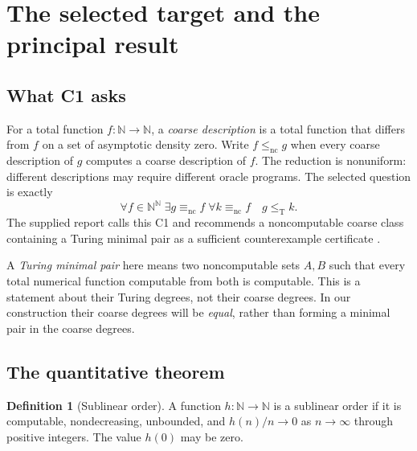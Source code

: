 \documentclass[11pt,a4paper]{article}
\newcommand{\N}{\mathbb N}
\newcommand{\Baire}{\N^{\N}}
\newcommand{\leT}{\leq_{\mathrm T}}
\newcommand{\nc}{\mathrm{nc}}
\theoremstyle{definition}\newtheorem{definition}[theorem]{Definition}
\theoremstyle{remark}\newtheorem{remark}[theorem]{Remark}
\begin{document}
{\small\tableofcontents}
\newpage

\section{The selected target and the principal result}
\label{sec:result}

\subsection{What C1 asks}
For a total function $f:\N\to\N$, a \emph{coarse description} is a total
function that differs from $f$ on a set of asymptotic density zero. Write
$f\leq_{\nc}g$ when every coarse description of $g$ computes a coarse
description of $f$. The reduction is nonuniform: different descriptions may
require different oracle programs. The selected question is exactly
\begin{equation}\label{eq:C1}
 \forall f\in\Baire\;\exists g\equiv_{\nc}f\;
 \forall k\equiv_{\nc}f\quad g\leT k.
\end{equation}
The supplied report calls this C1 and recommends a noncomputable coarse class
containing a Turing minimal pair as a sufficient counterexample certificate
\cite[Section~5, C1 and its diagnostic propositions]{Input}.

A \emph{Turing minimal pair} here means two noncomputable sets $A,B$ such that
every total numerical function computable from both is computable. This is a
statement about their Turing degrees, not their coarse degrees. In our
construction their coarse degrees will be \emph{equal}, rather than forming a
minimal pair in the coarse degrees.

\subsection{The quantitative theorem}
\begin{definition}[Sublinear order]
A function $h:\N\to\N$ is a sublinear order if it is computable,
nondecreasing, unbounded, and $h(n)/n\to0$ as $n\to\infty$ through positive
integers. The value $h(0)$ may be zero.
\end{definition}
\end{document}

